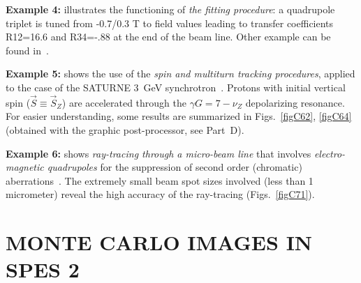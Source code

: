 \bigskip

\noindent\textbf{Example 4:} illustrates the functioning of \emph{the fitting
procedure}: a quadrupole triplet is tuned from  -0.7/0.3 T to field values leading to
transfer coefficients  R12=16.6  and R34=-.88  at the end of the beam line.  Other example 
can be found in~\protect\cite{ZgCern}. 

\bigskip


\noindent\textbf{Example 5:} shows the use of the 
\emph{spin and multiturn tracking procedures}, 
applied to the case of the SATURNE 3~GeV synchrotron~\protect\cite{Biblio3,Biblio7,Grorud}.
 Protons with initial vertical spin  ($\vec S\equiv\vec  S_Z $)  are 
accelerated through the $ \gamma G=7-\nu_ Z $ depolarizing resonance. For 
easier understanding, some results are summarized in Figs.~\ref{figC62}, \ref{figC64} %
(obtained with the graphic post-processor, see Part~D).
\bigskip 

\noindent\textbf{Example 6:} shows  \emph{ray-tracing through a micro-beam line}
that involves \emph{electro-magnetic quadrupoles} for the suppression of 
second order (chromatic) aberrations~\protect\cite{Biblio6}. The extremely small beam 
spot sizes involved (less than 1 micrometer) reveal the high 
accuracy of the ray-tracing (Figs.~\ref{figC71}).   %

 \cleardoublepage

\pagestyle{headings}

\section{MONTE CARLO IMAGES IN SPES 2}
\vfill

